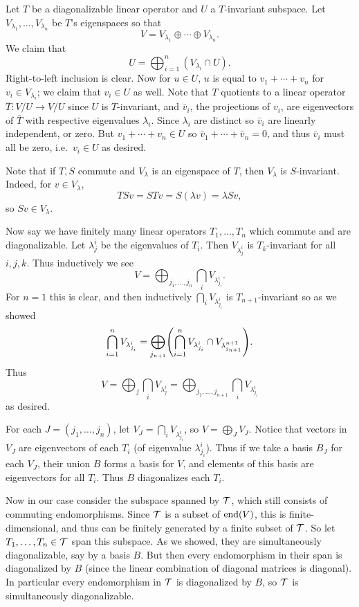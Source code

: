 \eprob

Let $T$ be a diagonalizable linear operator and $U$ a $T$-invariant subspace.
Let $V_{\lambda_1},\dots,V_{\lambda_n}$ be $T$'s eigenspaces so that
$$ V = V_{\lambda_1} \oplus \cdots \oplus V_{\lambda_n} . $$
We claim that
$$ U = \bigoplus_{i=1}^n(V_{\lambda_i}\cap U) . $$
Right-to-left inclusion is clear.
Now for $u\in U$, $u$ is equal to $v_1+\cdots+v_n$ for $v_i\in V_{\lambda_i}$; we claim that $v_i\in U$ as well.
Note that $T$ quotients to a linear operator $\bar T\colon V/U\to V/U$ since $U$ is $T$-invariant, and $\bar v_i$, the projections of $v_i$, are eigenvectors
of $\bar T$ with respective eigenvalues $\lambda_i$.
Since $\lambda_i$ are distinct so $\bar v_i$ are linearly independent, or zero.
But $v_1+\cdots+v_n\in U$ so $\bar v_1+\cdots+\bar v_n=0$, and thus $\bar v_i$ must all be zero, i.e.\ $v_i\in U$ as desired.

Note that if $T,S$ commute and $V_\lambda$ is an eigenspace of $T$, then $V_\lambda$ is $S$-invariant.
Indeed, for $v\in V_\lambda$,
$$ TSv = STv = S(\lambda v) = \lambda Sv , $$
so $Sv\in V_\lambda$.

Now say we have finitely many linear operators $T_1,\dots,T_n$ which commute and are diagonalizable.
Let $\lambda^i_j$ be the eigenvalues of $T_i$.
Then $V_{\lambda^i_j}$ is $T_k$-invariant for all $i,j,k$.
Thus inductively we see
$$ V = \bigoplus_{j_1,\dots,j_n} \bigcap_i V_{\lambda^i_{j_i}} . $$
For $n=1$ this is clear, and then inductively $\bigcap_iV_{\lambda^i_{j_i}}$ is $T_{n+1}$-invariant so as we showed
$$ \bigcap_{i=1}^nV_{\lambda^i_{j_i}} = \bigoplus_{j_{n+1}}\mathopen{}\mathclose{\left(\bigcap_{i=1}^n V_{\lambda^i_{j_i}}\cap V_{\lambda^{n+1}_{j_{n+1}}}\right)} . $$
Thus
$$ V = \bigoplus_j\bigcap_i V_{\lambda^i_j} = \bigoplus_{j_1,\dots,j_{n+1}}\bigcap_i V_{\lambda^i_{j_i}} $$
as desired.

For each $J=(j_1,\dots,j_n)$, let $V_J=\bigcap_iV_{\lambda^i_{j_i}}$, so $V=\bigoplus_JV_J$.
Notice that vectors in $V_J$ are eigenvectors of each $T_i$ (of eigenvalue $\lambda^i_{j_i}$).
Thus if we take a basis $B_J$ for each $V_J$, their union $B$ forms a basis for $V$, and elements of this basis are eigenvectors for all $T_i$.
Thus $B$ diagonalizes each $T_i$.

Now in our case consider the subspace spanned by ${{\cal T}}$, which still consists of commuting endomorphisms.
Since ${{\cal T}}$ is a subset of ${\rm end}(V)$, this is finite-dimensional, and thus can be finitely generated by a finite subset of ${{\cal T}}$.
So let $T_1,\dots,T_n\in{{\cal T}}$ span this subspace.
As we showed, they are simultaneously diagonalizable, say by a basis $B$.
But then every endomorphism in their span is diagonalized by $B$ (since the linear combination of diagonal matrices is diagonal).
In particular every endomorphism in ${{\cal T}}$ is diagonalized by $B$, so ${{\cal T}}$ is simultaneously diagonalizable.

\bye


